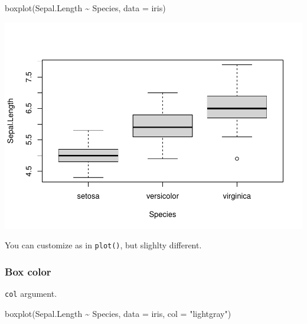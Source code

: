 \documentclass[
]{article}
\newenvironment{Shaded}{\begin{snugshade}}{\end{snugshade}}
\newcommand{\AttributeTok}[1]{\textcolor[rgb]{0.77,0.63,0.00}{#1}}
\newcommand{\FunctionTok}[1]{\textcolor[rgb]{0.00,0.00,0.00}{#1}}
\newcommand{\NormalTok}[1]{#1}
\newcommand{\SpecialCharTok}[1]{\textcolor[rgb]{0.00,0.00,0.00}{#1}}
\newcommand{\StringTok}[1]{\textcolor[rgb]{0.31,0.60,0.02}{#1}}
\begin{document}
\begin{Shaded}
\begin{Highlighting}[]
\FunctionTok{boxplot}\NormalTok{(Sepal.Length }\SpecialCharTok{\textasciitilde{}}\NormalTok{ Species, }\AttributeTok{data =}\NormalTok{ iris)}
\end{Highlighting}
\end{Shaded}

\begin{center}\includegraphics{biostats_files/figure-latex/unnamed-chunk-130-1} \end{center}

You can customize as in \texttt{plot()}, but slighlty different.

\hypertarget{box-color}{%
\subsubsection{Box color}\label{box-color}}

\texttt{col} argument.

\begin{Shaded}
\begin{Highlighting}[]
\FunctionTok{boxplot}\NormalTok{(Sepal.Length }\SpecialCharTok{\textasciitilde{}}\NormalTok{ Species, }\AttributeTok{data =}\NormalTok{ iris,}
        \AttributeTok{col =} \StringTok{"lightgray"}\NormalTok{)}
\end{Highlighting}
\end{Shaded}
\end{document}

